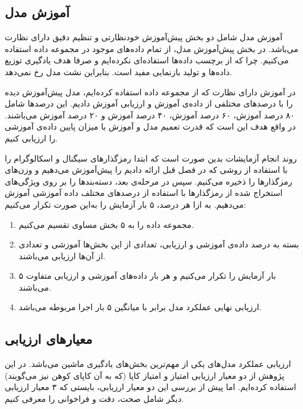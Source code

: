 \subsection{آموزش مدل}

آموزش مدل شامل دو بخش پیش‌آموزش خودنظارتی و تنظیم دقیق دارای نظارت می‌باشد. در بخش پیش‌آموزش مدل، از تمام داده‌های موجود در مجموعه داده استفاده می‌کنیم. چرا که از برچسب داده‌ها استفاده‌ای نکرده‌ایم و صرفا هدف یادگیری توزیع داده‌ها و تولید بازنمایی مفید است. بنابراین
نشت مدل
رخ نمی‌دهد.

در آموزش دارای نظارت که از مجموعه داده  استفاده کرده‌ایم، مدل پیش‌آموزش دیده را با درصدهای مختلفی از داده‌ی آموزش و ارزیابی آموزش دادیم. این درصدها شامل ۸۰ درصد آموزش، ۶۰ درصد آموزش، ۴۰ درصد آموزش و ۲۰ درصد آموزش می‌باشند. در واقع هدف این است که قدرت تعمیم مدل و آموزش با میزان پایین داده‌ی آموزشی را ارزیابی کنیم.

روند انجام آزمایشات بدین صورت است که ابتدا رمزگذارهای سیگنال و اسکالوگرام را با استفاده از روشی که در فصل قبل ارائه دادیم را پیش‌آموزش می‌دهیم و وزن‌های 
رمزگذارها را ذخیره می‌کنیم. سپس در مرحله‌ی بعد، دسته‌بندها را بر روی ویژگی‌های استخراج شده از رمزگذارها با استفاده از درصدهای مختلف داده آموزشی آموزش می‌دهیم. به ازا هر درصد، ۵ بار آزمایش را به‌این صورت تکرار می‌کنیم:
\begin{enumerate}
    \item مجموعه داده را به ۵ بخش مساوی تقسیم می‌کنیم.
    \item بسته به درصد داده‌ی آموزشی و ارزیابی، تعدادی از این بخش‌ها آموزشی و تعدادی از آن‌ها ارزیابی می‌باشند.
    \item ۵ بار آزمایش را تکرار می‌کنیم و هر بار داده‌های آموزشی و ارزیابی متفاوت می‌باشند.
    \item ارزیابی نهایی عملکرد مدل برابر با میانگین ۵ بار اجرا مربوطه می‌باشد.
\end{enumerate}

\subsection{معیارهای ارزیابی}

ارزیابی عملکرد مدل‌های یکی از مهم‌ترین بخش‌های یادگیری ماشین می‌باشد. در این پژوهش از دو معیار ارزیابی امتیاز 
و امتیاز کاپا
(که به آن کاپای کوهن نیز می‌گویند) استفاده کرده‌ایم. اما پیش از بررسی این دو معیار ارزیابی، بایستی که ۳ معیار ارزیابی دیگر شامل صحت، دقت و فراخوانی را معرفی کنیم.

